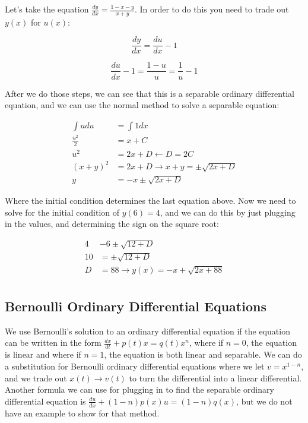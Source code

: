     \begin{problem}
      Let's take the equation $\frac{dy}{dx}=\frac{1-x-y}{x+y}$. In order to do this you need to trade out $y(x)$ for $u(x)$:

      \[
        \frac{dy}{dx}=\frac{du}{dx}-1
      \]

      \[
        \frac{du}{dx}-1=\frac{1-u}{u}=\frac{1}{u}-1
      \]

      After we do those steps, we can see that this is a separable ordinary differential equation, and we can use the normal method to solve a separable equation:

      \[
        \begin{aligned}
          \int udu&=\int1dx\\
          \frac{u^2}{2}&=x+C\\
          u^2&=2x+D\leftarrow D=2C\\
          (x+y)^2&=2x+D\rightarrow x+y=\pm\sqrt{2x+D}\\
          y&=-x\pm\sqrt{2x+D}
        \end{aligned}
      \]

      Where the initial condition determines the last equation above. Now we need to solve for the initial condition of $y(6)=4$, and we can do this by just plugging in the values, and determining the sign on the square root:

      \[
        \begin{aligned}
           4&-6\pm\sqrt{12+D}\\
          10&=\pm\sqrt{12+D}\\
          D&=88\to y(x)=-x+\sqrt{2x+88}\\
        \end{aligned}
      \]
    \end{problem}

  \subsection{Bernoulli Ordinary Differential Equations}

    We use Bernoulli's solution to an ordinary differential equation if the equation can be written in the form $\frac{dx}{dt}+p(t)x=q(t)x^n$, where if $n=0$, the equation is linear and where if $n=1$, the equation is both linear and separable. We can do a substitution for Bernoulli ordinary differential equations where we let $v=x^{1-n}$, and we trade out $x(t)\to v(t)$ to turn the differential into a linear differential. Another formula we can use for plugging in to find the separable ordinary differential equation is $\frac{du}{dx}+(1-n)p(x)u=(1-n)q(x)$, but we do not have an example to show for that method. 

